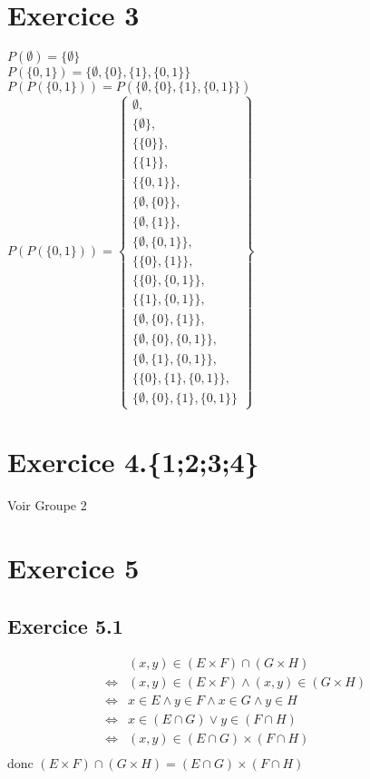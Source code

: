 \documentclass[a4paper,12pt]{article}
\begin{document}
\section{Exercice 3}
$P(\emptyset) = \{\emptyset\}$ \\
$P(\{0, 1\}) = \{\emptyset, \{0\}, \{1\}, \{0, 1\}\}$ \\
$P(P(\{0, 1\})) = P(\{\emptyset, \{0\}, \{1\}, \{0, 1\}\})$ \\
$P(P(\{0, 1\})) = \left\{\begin{array}{l}
\emptyset, \\
\{\emptyset\}, \\
\{\{0\}\}, \\
\{\{1\}\}, \\
\{\{0, 1\}\}, \\
\{\emptyset, \{0\}\}, \\
\{\emptyset, \{1\}\}, \\
\{\emptyset, \{0, 1\}\}, \\
\{\{0\}, \{1\}\}, \\
\{\{0\}, \{0, 1\}\}, \\
\{\{1\}, \{0, 1\}\}, \\
\{\emptyset, \{0\}, \{1\}\}, \\
\{\emptyset, \{0\}, \{0, 1\}\}, \\
\{\emptyset, \{1\}, \{0, 1\}\}, \\
\{\{0\}, \{1\}, \{0, 1\}\}, \\
\{\emptyset, \{0\}, \{1\}, \{0, 1\}\}
\end{array}
\right\}$
\section{Exercice 4.\{1;2;3;4\}}
Voir Groupe 2
\section{Exercice 5}
\subsection{Exercice 5.1}
\[
\begin{aligned}
&(x,y)\in (E \times F) \cap ( G \times H)\\
\Leftrightarrow&(x, y) \in (E \times F) \wedge (x,y) \in (G \times H)\\
\Leftrightarrow&x \in E \wedge y \in F \wedge x \in G \wedge y \in H \\
\Leftrightarrow&x\in (E \cap G) \vee y \in (F \cap H)\\
\Leftrightarrow&(x,y)\in (E \cap G) \times (F \cap H)\\
\end{aligned}
\]
donc  $(E \times F) \cap ( G \times H) =  (E \cap G) \times (F \cap H)$
\end{document}
